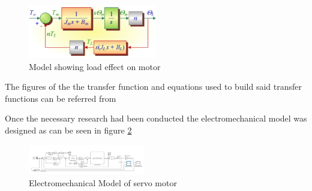 \begin{figure}[h]
 \centering
   \includegraphics[width = 0.5\textwidth]{figures/6.png}                \caption{Model showing load effect on motor}
   \label{fig:Model Showing Load Effect on motor}
\end{figure}
 The figures of the the transfer function and equations used to build said transfer functions can be referred from   \cite{article}
 




Once the necessary research had been conducted the electromechanical model was designed as can be seen in figure \ref{fig:Electromechanical Model}


\begin{figure}[H]
 \centering
   \includegraphics[width = 0.45\textwidth]{figures/14.png}  \caption{Electromechanical Model of servo motor}
   \label{fig:Electromechanical Model}
\end{figure}

